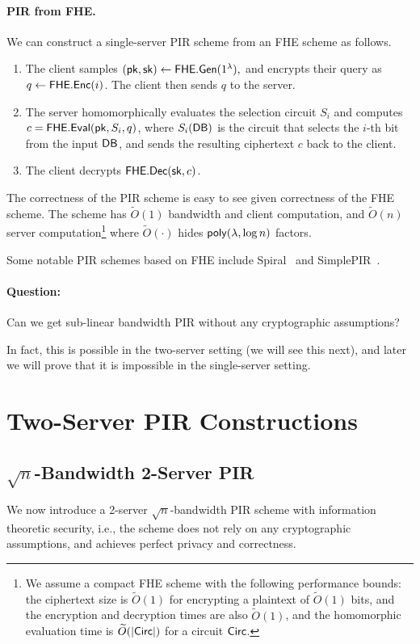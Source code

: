 \paragraph{PIR from FHE.}
We can construct a single-server PIR scheme from an FHE scheme 
as follows.
\begin{enumerate}
	\item The client samples $({\sf pk},{\sf sk}) \leftarrow {\sf FHE}.{\sf Gen}(1^\lambda),$ and encrypts their query as $q \leftarrow {\sf FHE}.{\sf Enc}(i)$. The client then sends $q$ to the server.
	\item The server homomorphically evaluates the selection circuit $S_i$ 
and computes ${c} = {\sf FHE}.{\sf Eval}({\sf pk}, S_i, q)$, where $S_i({\sf DB})$ 
is the circuit that selects the $i$-th bit from the input ${\sf DB}$, 
and sends the resulting ciphertext $c$ back to the client. 
	\item The client decrypts ${\sf FHE}.{\sf Dec}({\sf sk}, c)$.
\end{enumerate}
The correctness of the PIR scheme is easy to see
given correctness of the FHE scheme. 
The scheme has $\widetilde{O}(1)$ bandwidth and 
client computation, and $\widetilde{O}(n)$ 
server computation\footnote{We assume a compact
FHE scheme with the following
performance bounds: 
the ciphertext size is 
$\widetilde{O}(1)$ for encrypting a plaintext
of $\widetilde{O}(1)$ bits, and the encryption
and decryption times are also $\widetilde{O}(1)$, 
and the homomorphic evaluation
time
is $\widetilde{O}(|{\sf Circ}|)$
 for a circuit ${\sf Circ}$.} 
where $\widetilde{O}(\cdot)$ hides
${\sf poly}(\lambda, \log n)$ factors.


Some notable PIR schemes based on FHE 
include Spiral~\cite{spiral} 
and SimplePIR~\cite{simplepir}.

\paragraph{Question:} Can we get sub-linear bandwidth PIR 
without any cryptographic assumptions? 

In fact, this is possible in the two-server setting (we will see this next), 
and later we will prove that it is impossible in the single-server setting.

\section{Two-Server PIR Constructions}
\subsection{$\sqrt{n}$-Bandwidth 
2-Server PIR} %
We now introduce a 2-server $\sqrt{n}$-bandwidth
PIR scheme 
with information theoretic security, i.e., 
the scheme does not rely on any cryptographic assumptions,
and achieves perfect privacy and correctness.

